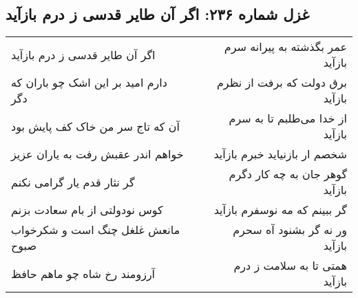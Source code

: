 \begin{center}
\section*{غزل شماره ۲۳۶: اگر آن طایر قدسی ز درم بازآید}
\label{sec:sh236}
\begin{longtable}{l p{0.5cm} r}
اگر آن طایر قدسی ز درم بازآید
&&
عمر بگذشته به پیرانه سرم بازآید
\\
دارم امید بر این اشک چو باران که دگر
&&
برق دولت که برفت از نظرم بازآید
\\
آن که تاج سر من خاک کف پایش بود
&&
از خدا می‌طلبم تا به سرم بازآید
\\
خواهم اندر عقبش رفت به یاران عزیز
&&
شخصم ار بازنیاید خبرم بازآید
\\
گر نثار قدم یار گرامی نکنم
&&
گوهر جان به چه کار دگرم بازآید
\\
کوس نودولتی از بام سعادت بزنم
&&
گر ببینم که مه نوسفرم بازآید
\\
مانعش غلغل چنگ است و شکرخواب صبوح
&&
ور نه گر بشنود آه سحرم بازآید
\\
آرزومند رخ شاه چو ماهم حافظ
&&
همتی تا به سلامت ز درم بازآید
\\
\end{longtable}
\end{center}

